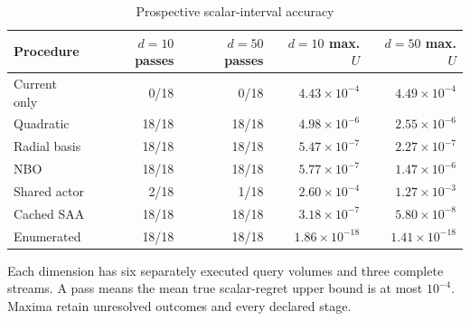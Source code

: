 \begin{table}[htbp]
\centering\small
\caption{Prospective scalar-interval accuracy}\label{tab:r19accuracy}
\begin{tabular}{lrrrr}
\toprule
Procedure & $d=10$ passes & $d=50$ passes & $d=10$ max. $U$ & $d=50$ max. $U$\\
\midrule
Current only & 0/18 & 0/18 & $4.43\times10^{-4}$ & $4.49\times10^{-4}$\\
Quadratic & 18/18 & 18/18 & $4.98\times10^{-6}$ & $2.55\times10^{-6}$\\
Radial basis & 18/18 & 18/18 & $5.47\times10^{-7}$ & $2.27\times10^{-7}$\\
NBO & 18/18 & 18/18 & $5.77\times10^{-7}$ & $1.47\times10^{-6}$\\
Shared actor & 2/18 & 1/18 & $2.60\times10^{-4}$ & $1.27\times10^{-3}$\\
Cached SAA & 18/18 & 18/18 & $3.18\times10^{-7}$ & $5.80\times10^{-8}$\\
Enumerated & 18/18 & 18/18 & $1.86\times10^{-18}$ & $1.41\times10^{-18}$\\
\bottomrule
\end{tabular}
\par\smallskip\begin{minipage}{.96\textwidth}\footnotesize Each dimension has six separately executed query volumes and three complete streams. A pass means the mean true scalar-regret upper bound is at most $10^{-4}$. Maxima retain unresolved outcomes and every declared stage.\end{minipage}
\end{table}
